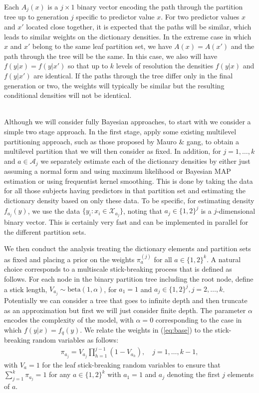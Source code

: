 \documentclass[11pt]{article}
\begin{document}
Each $A_j(x)$ is a $j \times 1$ binary vector encoding the path through the partition tree up to generation $j$ specific to predictor value $x$.  For two predictor values $x$ and $x'$ located close together, it is expected that the paths will be similar, which leads to similar weights on the dictionary densities.  In the extreme case in which $x$ and $x'$ belong to the same leaf partition set, we have $A(x) = A(x')$ and the path through the tree will be the same.  In this case, we also will have $f(y|x)=f(y|x')$ so that up to $k$ levels of resolution the densities $f(y|x)$ and 
$f(y|x')$ are identical.  If the paths through the tree differ only in the final generation or two, the weights will typically be similar but the resulting conditional densities will not be identical.
\vskip 12pt 

{} \\ 
Although we will consider fully Bayesian approaches, to start with we consider a simple two stage approach.  In the first stage, apply some existing multilevel partitioning approach, such as those proposed by Mauro \& gang, to obtain a multilevel partition that we will then consider as fixed.  In addition, for $j=1,\ldots,k$ and $a \in \mathcal{A}_j$ we separately estimate each of the dictionary densities by either just assuming a normal form and using maximum likelihood or Bayesian MAP estimation or using frequentist kernel smoothing.  This is done by taking the data for all those subjects having predictors in that partition set and estimating the dictionary density based on only these data.  To be specific, for estimating density $f_{a_j}(y)$, we use the data $\{ y_i: x_i \in \mathcal{X}_{a_j} \}$, noting that $a_j \in \{1,2\}^j$ is a $j$-dimensional binary vector.  This is certainly very fast and can be implemented in parallel for the different partition sets.  

We then conduct the analysis treating the dictionary elements and partition sets as fixed and placing a prior on the weights $\pi_a^{(j)}$ for all $a \in \{1,2\}^k$.  A natural choice corresponds to a multiscale stick-breaking process that is defined as follows.  For each node in the binary partition tree including the root node, define a stick length, $V_{a_j} \sim \mbox{beta}(1,\alpha)$, for $a_1=1$ and $a_j \in \{1,2\}^j, j=2,\ldots,k$.  Potentially we can consider a tree that goes to infinite depth and then truncate as an approximation but first we will just consider finite depth.  The parameter $\alpha$ encodes the complexity of the model, with $\alpha = 0$ corresponding to the case in which $f(y|x) = f_q(y)$.  We relate the weights in (\ref{eq:base}) to the stick-breaking random variables as follows: 
\begin{eqnarray}
\pi_{a_j} = V_{a_j} \prod_{h=1}^{j-1} (1 - V_{a_h}),\quad j=1,\ldots,k-1, \label{eq:TreeStick}
\end{eqnarray}
with $V_a=1$ for the leaf stick-breaking random variables to ensure that $\sum_{j=1}^k \pi_{a_j} = 1$ for any $a \in \{1,2\}^k$ with $a_1 = 1$ and $a_j$ denoting the first $j$ elements of $a$.    
\vskip 12pt
\end{document}
